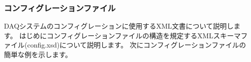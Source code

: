 \documentclass[a4j,10pt,dvips,onecolumn,oneside,final]{jarticle}%
\begin{document}

\subsubsection{コンフィグレーションファイル}\label{config-file}
DAQシステムのコンフィグレーションに使用するXML文書について説明します。
はじめにコンフィグレーションファイルの構造を規定するXMLスキーマファイル(config.xsd)について説明します。
次にコンフィグレーションファイルの簡単な例を示します。
\end{document}
